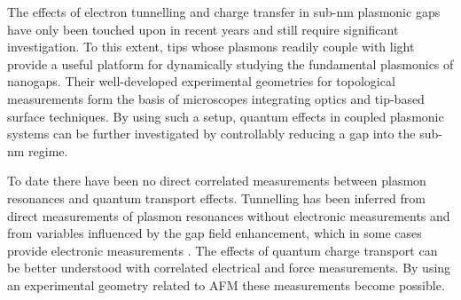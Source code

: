 \documentclass[12pt, a4paper, oneside]{book}
\begin{document}
The effects of electron tunnelling and charge transfer in sub-nm plasmonic gaps have only been touched upon in recent years and still require significant investigation. To this extent, tips whose plasmons readily couple with light provide a useful platform for dynamically studying the fundamental plasmonics of nanogaps. Their well-developed experimental geometries for topological measurements form the basis of microscopes integrating optics and tip-based surface techniques. By using such a setup, quantum effects in coupled plasmonic systems can be further investigated by controllably reducing a gap into the sub-nm regime.

To date there have been no direct correlated measurements between plasmon resonances and quantum transport effects. Tunnelling has been inferred from direct measurements of plasmon resonances without electronic measurements \cite{savage2012, scholl2013} and from variables influenced by the gap field enhancement, which in some cases provide electronic measurements \cite{tan2014, zhu2014, hajisalem2014, cha2014}. The effects of quantum charge transport can be better understood with correlated electrical and force measurements. By using an experimental geometry related to AFM these measurements become possible.

\ifstandalone
\begin{singlespace}
\fontsize{8pt}{1em}\selectfont
\printbibliography[notcategory=fullcited]
\end{singlespace}
\fi
\end{document}
